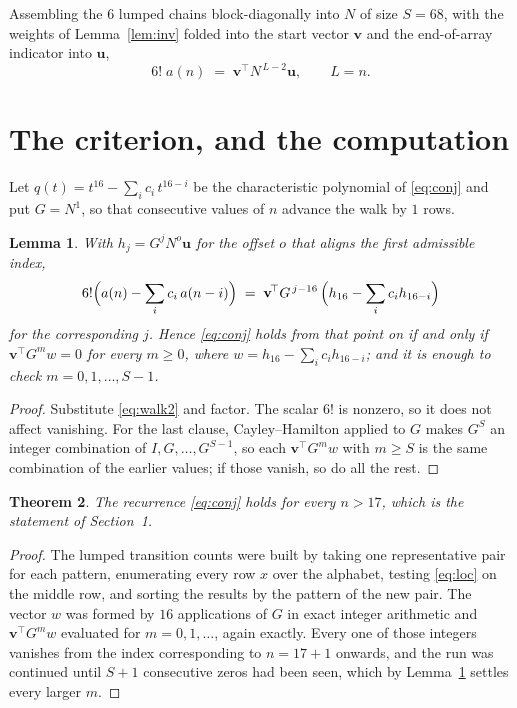 \documentclass[11pt,a4paper]{article}
\theoremstyle{plain}
\newtheorem{theorem}{Theorem}
\newtheorem{lemma}[theorem]{Lemma}
\theoremstyle{definition}
\begin{document}
Assembling the $6$ lumped chains block-diagonally into $N$ of size $S=68$, with the
weights of Lemma~\ref{lem:inv} folded into the start vector $\mathbf{v}$ and the
end-of-array indicator into $\mathbf{u}$,
\begin{equation}\label{eq:walk2}
6!\;a(n)\;=\;\mathbf{v}^{\!\top}N^{\,L-2}\mathbf{u},\qquad L=n .
\end{equation}

\section{The criterion, and the computation}

Let $q(t)=t^{16}-\sum_i c_i\,t^{16-i}$ be the characteristic polynomial of
\eqref{eq:conj} and put $G=N^{1}$, so that consecutive values of $n$ advance the
walk by $1$ rows.

\begin{lemma}\label{lem:crit}
With $h_j=G^{j}N^{o}\mathbf{u}$ for the offset $o$ that aligns the first admissible
index,
\[
6!\Bigl(a(n)-\sum_i c_i\,a(n-i)\Bigr)\;=\;\mathbf{v}^{\!\top}G^{\,j-16}\,
\Bigl(h_{16}-\sum_i c_i h_{16-i}\Bigr)
\]
for the corresponding $j$. Hence \eqref{eq:conj} holds from that point on if and only if
$\mathbf{v}^{\!\top}G^{m}w=0$ for every $m\ge0$, where
$w=h_{16}-\sum_i c_ih_{16-i}$; and it is enough to check $m=0,1,\dots,S-1$.
\end{lemma}

\begin{proof}
Substitute \eqref{eq:walk2} and factor. The scalar $6!$ is nonzero, so it does not
affect vanishing. For the last clause, Cayley--Hamilton applied to $G$ makes $G^{S}$ an
integer combination of $I,G,\dots,G^{S-1}$, so each $\mathbf{v}^{\!\top}G^{m}w$ with
$m\ge S$ is the same combination of the earlier values; if those vanish, so do all the rest.
\end{proof}

\begin{theorem}
The recurrence \eqref{eq:conj} holds for every $n>17$, which is the statement of
Section~1.
\end{theorem}

\begin{proof}
The lumped transition counts were built by taking one representative pair for each pattern,
enumerating every row $x$ over the alphabet, testing \eqref{eq:loc} on the middle
row, and sorting the results by the pattern of the new pair. The vector $w$ was formed by
$16$ applications of $G$ in exact integer arithmetic and $\mathbf{v}^{\!\top}G^{m}w$
evaluated for $m=0,1,\dots$, again exactly. Every one of those integers vanishes from the
index corresponding to $n=17+1$ onwards, and the run was continued until $S+1$
consecutive zeros had been seen, which by Lemma~\ref{lem:crit} settles every larger $m$.
\end{proof}
\end{document}
